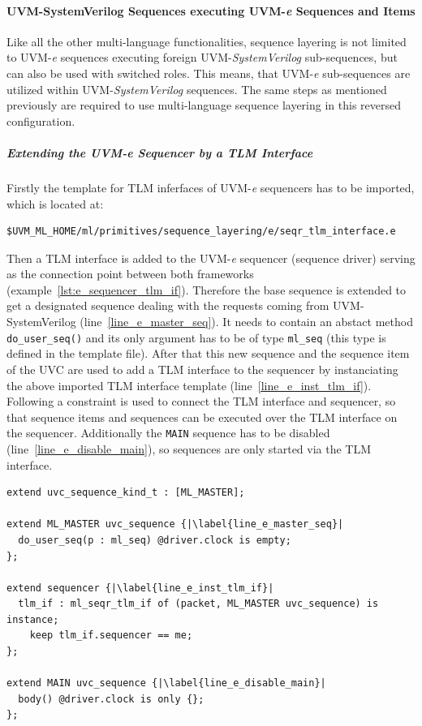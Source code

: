 \paragraph{UVM-SystemVerilog Sequences executing UVM-\textit{e} Sequences and Items}
Like all the other multi-language functionalities, sequence layering is not limited to UVM-\textit{e} sequences executing foreign UVM-\emph{SystemVerilog} sub-sequences, but can also be used with switched roles. This means, that UVM-\textit{e} sub-sequences are utilized within UVM-\emph{SystemVerilog} sequences. The same steps as mentioned previously are required to use multi-language sequence layering in this reversed configuration. 
\subparagraph{Extending the UVM-\textit{e} Sequencer by a TLM Interface}\label{e_seqr_tlm}
Firstly the template for TLM inferfaces of UVM-\textit{e} sequencers has to be imported, which is located at:
\smallskip
{}
\begin{lstlisting}
$UVM_ML_HOME/ml/primitives/sequence_layering/e/seqr_tlm_interface.e
\end{lstlisting} 
\smallskip
Then a TLM interface is added to the UVM-\textit{e} sequencer (sequence driver) serving as the connection point between both frameworks (example~\ref{lst:e_sequencer_tlm_if}). Therefore the base sequence is extended to get a designated sequence dealing with the requests coming from UVM-SystemVerilog (line~\ref{line_e_master_seq}). It needs to contain an abstact method \lstinline$do_user_seq()$ and its only argument has to be of type \lstinline$ml_seq$ (this type is defined in the template file).
After that this new sequence and the sequence item of the UVC are used to add a TLM interface to the sequencer by instanciating the above imported TLM interface template (line~\ref{line_e_inst_tlm_if}). Following a constraint is used to connect the TLM interface and sequencer, so that sequence items and sequences can be executed over the TLM interface on the sequencer.
Additionally the \lstinline$MAIN$ sequence has to be disabled (line~\ref{line_e_disable_main}), so sequences are only started via the TLM interface.
\lstset{language=e, numbers = left, escapechar=|, breaklines=true}
\begin{lstlisting}[frame=htrbl, caption={\textit{e}: adding a TLM interface to the UVM-\textit{e} sequencer},
label={lst:e_sequencer_tlm_if}]
extend uvc_sequence_kind_t : [ML_MASTER];

extend ML_MASTER uvc_sequence {|\label{line_e_master_seq}|
  do_user_seq(p : ml_seq) @driver.clock is empty;
};

extend sequencer {|\label{line_e_inst_tlm_if}|
  tlm_if : ml_seqr_tlm_if of (packet, ML_MASTER uvc_sequence) is instance;
    keep tlm_if.sequencer == me;
};

extend MAIN uvc_sequence {|\label{line_e_disable_main}|
  body() @driver.clock is only {};
};
\end{lstlisting}
